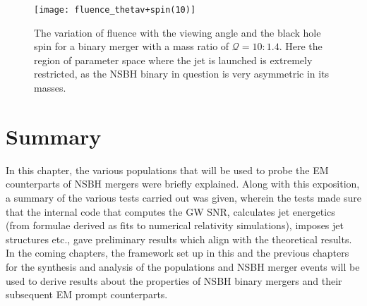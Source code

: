     \begin{figure}[ht]
        \centering
        \texttt{[image: fluence\_thetav+spin(10)]}
        \caption[Variation of $\mathcal{F}(\chi_{BH}, \theta_{v})$ for a
        $\mathcal{Q}=10:1.4$ NSBH binary merger]{
            The variation of fluence with the viewing angle and the black hole spin for
            a binary merger with a mass ratio of $\mathcal{Q}=10:1.4$. Here the region
            of parameter space where the jet is launched is extremely restricted, as the
            NSBH binary in question is very asymmetric in its masses.
        }
        \label{fig:fluence_thetav+spin(10)}
    \end{figure}

\section{Summary}

    In this chapter, the various populations that will be used to probe the EM
    counterparts of NSBH mergers were briefly explained. Along with this exposition, a
    summary of the various tests carried out was given, wherein the tests made sure that
    the internal code that computes the GW SNR, calculates jet energetics (from formulae
    derived as fits to numerical relativity simulations), imposes jet structures etc.,
    gave preliminary results which align with the theoretical results.\\
    In the coming chapters, the framework set up in this and the previous chapters for
    the synthesis and analysis of the populations and NSBH merger events will be used to
    derive results about the properties of NSBH binary mergers and their subsequent EM
    prompt counterparts.
